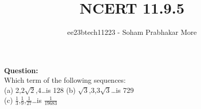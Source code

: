 \documentclass[journal,12pt,twocolumn]{IEEEtran}
\theoremstyle{remark}
\begin{document}

\vspace{3cm}

\title{NCERT 11.9.5} %
\author{ee23btech11223 - Soham Prabhakar More%
}
\maketitle
\newpage
\bigskip

\renewcommand{\thefigure}{\theenumi}
\renewcommand{\thetable}{\theenumi}



\textbf{Question:}\\
Which term of the following sequences:\\
(a) 2,$2\sqrt{2}$,4\dots is 128
\quad(b) $\sqrt{3}$,3,$3\sqrt{3}$\dots is 729\\
(c) $\frac{1}{3}$,$\frac{1}{9}$,$\frac{1}{27}$\dots is $\frac{1}{19683}$
\end{document}
